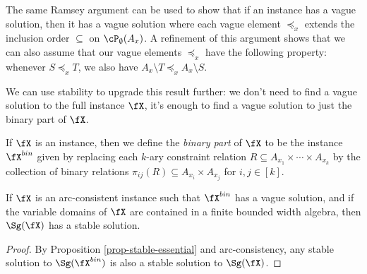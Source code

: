 \begin{rem} The same Ramsey argument can be used to show that if an instance has a vague solution, then it has a vague solution where each vague element $\preceq_x$ extends the inclusion order $\subseteq$ on $\cP_\emptyset(A_x)$. A refinement of this argument shows that we can also assume that our vague elements $\preceq_x$ have the following property: whenever $S \preceq_x T$, we also have $A_x\setminus T \preceq_x A_x \setminus S$.
\end{rem}

We can use stability to upgrade this result further: we don't need to find a vague solution to the full instance $\fX$, it's enough to find a vague solution to just the binary part of $\fX$.

\begin{defn} If $\fX$ is an instance, then we define the \emph{binary part} of $\fX$ to be the instance $\fX^{bin}$ given by replacing each $k$-ary constraint relation $R \subseteq A_{x_1} \times \cdots \times A_{x_k}$ by the collection of binary relations $\pi_{ij}(R) \subseteq A_{x_i} \times A_{x_j}$ for $i,j \in [k]$.
\end{defn}

\begin{cor}\label{cor-vague-bin} If $\fX$ is an arc-consistent instance such that $\fX^{bin}$ has a vague solution, and if the variable domains of $\fX$ are contained in a finite bounded width algebra, then $\Sg(\fX)$ has a stable solution.
\end{cor}
\begin{proof} By Proposition \ref{prop-stable-essential} and arc-consistency, any stable solution to $\Sg(\fX^{bin})$ is also a stable solution to $\Sg(\fX)$.
\end{proof}

